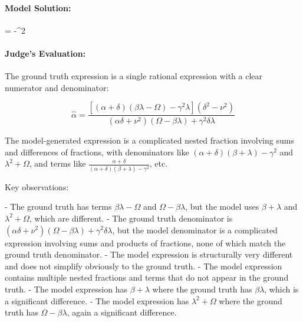 \documentclass[10pt]{article}
\begin{document}
\paragraph*{Model Solution:}
\displaystyle
\hat{\alpha}= 
     {
      -^{2}}

\paragraph*{Judge's Evaluation:}

The ground truth expression is a single rational expression with a clear numerator and denominator:

\[
\hat{\alpha} = \frac{ \left[(\alpha +\delta ) (\beta  \lambda -\Omega )-\gamma ^2 \lambda \right] \left(\delta ^2-\nu ^2\right) }{\left(\alpha  \delta +\nu ^2\right) (\Omega -\beta  \lambda )+\gamma ^2 \delta  \lambda }
\]

The model-generated expression is a complicated nested fraction involving sums and differences of fractions, with denominators like \((\alpha+\delta)(\beta+\lambda)-\gamma^2\) and \(\lambda^2 + \Omega\), and terms like \(\frac{\alpha+\delta}{(\alpha+\delta)(\beta+\lambda)-\gamma^2}\), etc.

Key observations:

- The ground truth has terms \(\beta \lambda - \Omega\) and \(\Omega - \beta \lambda\), but the model uses \(\beta + \lambda\) and \(\lambda^2 + \Omega\), which are different.
- The ground truth denominator is \(\left(\alpha \delta + \nu^2\right)(\Omega - \beta \lambda) + \gamma^2 \delta \lambda\), but the model denominator is a complicated expression involving sums and products of fractions, none of which match the ground truth denominator.
- The model expression is structurally very different and does not simplify obviously to the ground truth.
- The model expression contains multiple nested fractions and terms that do not appear in the ground truth.
- The model expression has \(\beta + \lambda\) where the ground truth has \(\beta \lambda\), which is a significant difference.
- The model expression has \(\lambda^2 + \Omega\) where the ground truth has \(\Omega - \beta \lambda\), again a significant difference.
\end{document}
